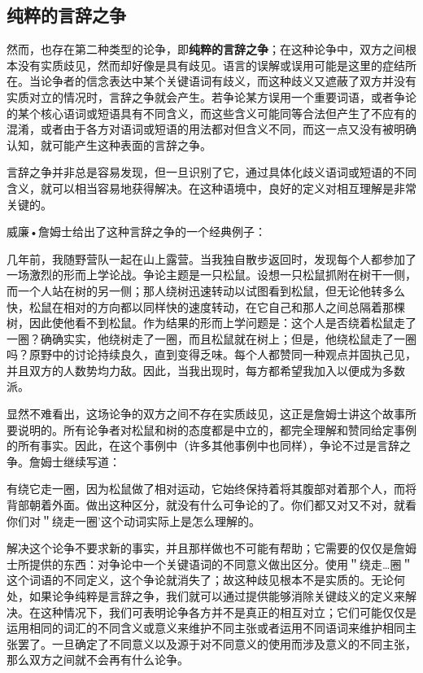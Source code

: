 \subsection{纯粹的言辞之争}

然而，也存在第二种类型的论争，即\textbf{纯粹的言辞之争}；在这种论争中，双方之间根本没有实质歧见，然而却好像是具有歧见。语言的误解或误用可能是这里的症结所在。当论争者的信念表达中某个关键语词有歧义，而这种歧义又遮蔽了双方并没有实质对立的情况时，言辞之争就会产生。若争论某方误用一个重要词语，或者争论的某个核心语词或短语具有不同含义，而这些含义可能同等合法但产生了不应有的混淆，或者由于各方对语词或短语的用法都对但含义不同，而这一点又没有被明确认知，就可能产生这种表面的言辞之争。

言辞之争并非总是容易发现，但一旦识别了它，通过具体化歧义语词或短语的不同含义，就可以相当容易地获得解决。在这种语境中，良好的定义对相互理解是非常关键的。

威廉•詹姆士给出了这种言辞之争的一个经典例子：

\begin{displayquote}
几年前，我随野营队一起在山上露营。当我独自散步返回时，发现每个人都参加了一场激烈的形而上学论战。争论主题是一只松鼠。设想一只松鼠抓附在树干一侧，而一个人站在树的另一侧；那人绕树迅速转动以试图看到松鼠，但无论他转多么快，松鼠在相对的方向都以同样快的速度转动，在它自己和那人之间总隔着那棵树，因此使他看不到松鼠。作为结果的形而上学问题是：这个人是否绕着松鼠走了一圈？确确实实，他绕树走了一圈，而且松鼠就在树上；但是，他绕松鼠走了一圈吗？原野中的讨论持续良久，直到变得乏味。每个人都赞同一种观点并固执己见，并且双方的人数势均力敌。因此，当我出现时，每方都希望我加入以便成为多数派。\cite{james1907}
\end{displayquote}

显然不难看出，这场论争的双方之间不存在实质歧见，这正是詹姆士讲这个故事所要说明的。所有论争者对松鼠和树的态度都是中立的，都完全理解和赞同给定事例的所有事实。因此，在这个事例中（许多其他事例中也同样），争论不过是言辞之争。詹姆士继续写道：

\begin{displayquote}
有绕它走一圈，因为松鼠做了相对运动，它始终保持着将其腹部对着那个人，而将背部朝着外面。做出这种区分，就没有什么可争论的了。你们都又对又不对，就看你们对＂绕走一圈'这个动词实际上是怎么理解的。\cite{james1907}
\end{displayquote}

解决这个论争不要求新的事实，并且那样做也不可能有帮助；它需要的仅仅是詹姆士所提供的东西：对争论中一个关键语词的不同意义做出区分。使用＂绕走…圈＂这个词语的不同定义，这个争论就消失了；故这种歧见根本不是实质的。无论何处，如果论争纯粹是言辞之争，我们就可以通过提供能够消除关键歧义的定义来解决。在这种情况下，我们可表明论争各方并不是真正的相互对立；它们可能仅仅是运用相同的词汇的不同含义或意义来维护不同主张或者运用不同语词来维护相同主张罢了。一旦确定了不同意义以及源于对不同意义的使用而涉及意义的不同主张，那么双方之间就不会再有什么论争。\cite{rudin1992}

